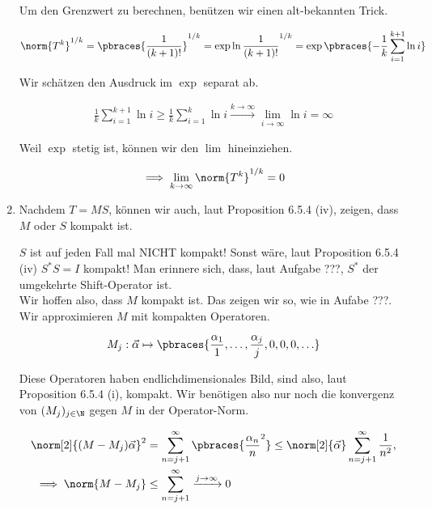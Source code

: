 \begin{solution}
\begin{enumerate}[label = (\alph*)]
  Um den Grenzwert zu berechnen, benützen wir einen alt-bekannten Trick.

  \begin{align*}
    \norm{T^k}^{1/k}
    =
    \pbraces{\frac{1}{(k+1)!}}^{1/k}
    =
    \exp \ln \frac{1}{(k+1)!}^{1/k}
    =
    \exp \pbraces
    {
      -\frac{1}{k}
      \sum_{i=1}^{k+1}
      \ln{i}
    }
  \end{align*}


  Wir schätzen den Ausdruck im $\exp$ separat ab.

  \begin{align*}
    \frac{1}{k}
    \sum_{i=1}^{k+1}
    \ln{i}
    \geq
    \frac{1}{k}
    \sum_{i=1}^k
    \ln{i}
    \xrightarrow{k \to \infty}
    \lim_{i \to \infty}
    \ln{i}
    =
    \infty
  \end{align*}

  Weil $\exp$ stetig ist, können wir den $\lim$ hineinziehen.

  \begin{align*}
    \implies
    \lim_{k \to \infty}
    \norm{T^k}^{1/k}
    =
    0
  \end{align*}

  \item
  Nachdem $T = M S$, können wir auch, laut Proposition 6.5.4 (iv), zeigen, dass $M$ oder $S$ kompakt ist.


  $S$ ist auf jeden Fall mal NICHT kompakt!
  Sonst wäre, laut Proposition 6.5.4 (iv) $S^\ast S = I$ kompakt!
  Man erinnere sich, dass, laut Aufgabe ???, $S^\ast$ der umgekehrte Shift-Operator ist. \\

  Wir hoffen also, dass $M$ kompakt ist.
  Das zeigen wir so, wie in Aufabe ???.
  Wir approximieren $M$ mit kompakten Operatoren.

  \begin{align*}
    M_j:
    \vec \alpha
    \mapsto
    \pbraces
    {
      \frac{\alpha_1}{1},
      \ldots,
      \frac{\alpha_j}{j},
      0, 0, 0, \ldots
    }
  \end{align*}

  Diese Operatoren haben endlichdimensionales Bild, sind also, laut Proposition 6.5.4 (i), kompakt.
  Wir benötigen also nur noch die konvergenz von $(M_j)_{j \in \N}$ gegen $M$ in der Operator-Norm.

  \begin{align*}
    \norm[2]{(M - M_j) \vec \alpha}^2
    & =
    \sum_{n = j+1}^\infty
    \pbraces
    {
      \frac{\alpha_n}{n}^2
    }
    \leq
    \norm[2]{\vec \alpha}
    \sum_{n = j+1}^\infty
    \frac{1}{n^2}, \\
    \implies
    \norm{M - M_j}
    & \leq
    \sum_{n = j+1}^\infty
    \xrightarrow{j \to \infty} 0
  \end{align*}


\end{enumerate}
\end{solution}
